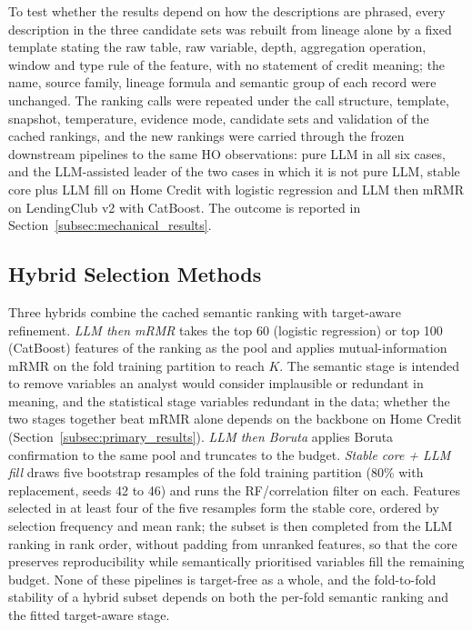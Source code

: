 \documentclass[final,5p,twocolumn]{elsarticle}
\newcommand{\Kfeat}{K}
\begin{document}
To test whether the results depend on how the descriptions are phrased, every description in the three candidate sets was rebuilt from lineage alone by a fixed template stating the raw table, raw variable, depth, aggregation operation, window and type rule of the feature, with no statement of credit meaning; the name, source family, lineage formula and semantic group of each record were unchanged. The ranking calls were repeated under the call structure, template, snapshot, temperature, evidence mode, candidate sets and validation of the cached rankings, and the new rankings were carried through the frozen downstream pipelines to the same HO observations: pure LLM in all six cases, and the LLM-assisted leader of the two cases in which it is not pure LLM, stable core plus LLM fill on Home Credit with logistic regression and LLM then mRMR on LendingClub v2 with CatBoost. The outcome is reported in Section~\ref{subsec:mechanical_results}.

\subsection{Hybrid Selection Methods}
\label{subsec:hybrid_fs}

Three hybrids combine the cached semantic ranking with target-aware refinement. \emph{LLM then mRMR} takes the top 60 (logistic regression) or top 100 (CatBoost) features of the ranking as the pool and applies mutual-information mRMR on the fold training partition to reach $\Kfeat$. The semantic stage is intended to remove variables an analyst would consider implausible or redundant in meaning, and the statistical stage variables redundant in the data; whether the two stages together beat mRMR alone depends on the backbone on Home Credit (Section~\ref{subsec:primary_results}). \emph{LLM then Boruta} applies Boruta confirmation to the same pool and truncates to the budget. \emph{Stable core + LLM fill} draws five bootstrap resamples of the fold training partition (80\% with replacement, seeds 42 to 46) and runs the RF/correlation filter on each. Features selected in at least four of the five resamples form the stable core, ordered by selection frequency and mean rank; the subset is then completed from the LLM ranking in rank order, without padding from unranked features, so that the core preserves reproducibility while semantically prioritised variables fill the remaining budget. None of these pipelines is target-free as a whole, and the fold-to-fold stability of a hybrid subset depends on both the per-fold semantic ranking and the fitted target-aware stage.
\end{document}
